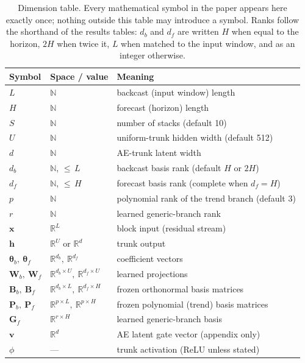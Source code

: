 \begin{table}[t]
\centering
\small
\caption{Dimension table. Every mathematical symbol in the paper appears here
exactly once; nothing outside this table may introduce a symbol. Ranks follow
the shorthand of the results tables: $d_b$ and $d_f$ are written $H$ when
equal to the horizon, $2H$ when twice it, $L$ when matched to the input
window, and as an integer otherwise.}
\label{tab:dimensions}
\begin{tabular}{lll}
\toprule
Symbol & Space / value & Meaning \\
\midrule
$L$ & $\mathbb{N}$ & backcast (input window) length \\
$H$ & $\mathbb{N}$ & forecast (horizon) length \\
$S$ & $\mathbb{N}$ & number of stacks (default 10) \\
$U$ & $\mathbb{N}$ & uniform-trunk hidden width (default 512) \\
$d$ & $\mathbb{N}$ & AE-trunk latent width \\
$d_b$ & $\mathbb{N}$, ${\le}\,L$ & backcast basis rank (default $H$ or $2H$) \\
$d_f$ & $\mathbb{N}$, ${\le}\,H$ & forecast basis rank (complete when $d_f = H$) \\
$p$ & $\mathbb{N}$ & polynomial rank of the trend branch (default 3) \\
$r$ & $\mathbb{N}$ & learned generic-branch rank \\
$\mathbf{x}$ & $\mathbb{R}^L$ & block input (residual stream) \\
$\mathbf{h}$ & $\mathbb{R}^U$ or $\mathbb{R}^d$ & trunk output \\
$\boldsymbol{\theta}_b,\ \boldsymbol{\theta}_f$
  & $\mathbb{R}^{d_b},\ \mathbb{R}^{d_f}$ & coefficient vectors \\
$\mathbf{W}_b,\ \mathbf{W}_f$
  & $\mathbb{R}^{d_b\times U},\ \mathbb{R}^{d_f\times U}$ & learned projections \\
$\mathbf{B}_b,\ \mathbf{B}_f$
  & $\mathbb{R}^{d_b\times L},\ \mathbb{R}^{d_f\times H}$
  & frozen orthonormal basis matrices \\
$\mathbf{P}_b,\ \mathbf{P}_f$
  & $\mathbb{R}^{p\times L},\ \mathbb{R}^{p\times H}$
  & frozen polynomial (trend) basis matrices \\
$\mathbf{G}_f$ & $\mathbb{R}^{r\times H}$ & learned generic-branch basis \\
$\mathbf{v}$ & $\mathbb{R}^d$ & AE latent gate vector (appendix only) \\
$\phi$ & --- & trunk activation (ReLU unless stated) \\
\bottomrule
\end{tabular}
\end{table}

